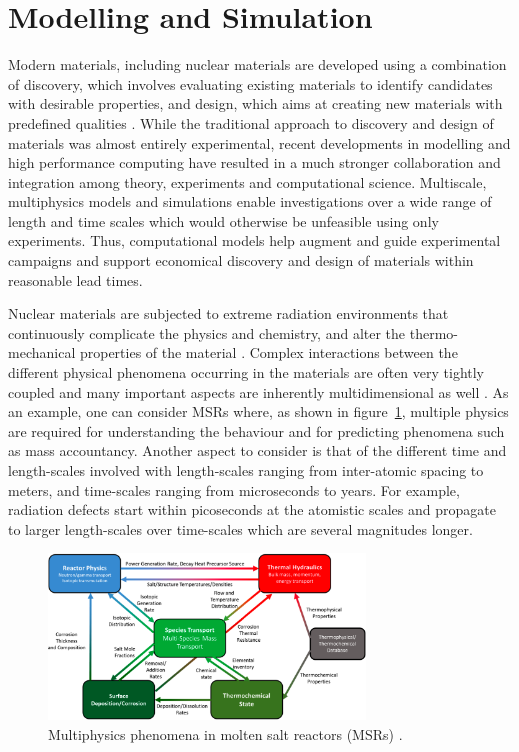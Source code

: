 \section{Modelling and Simulation}
	Modern materials, including nuclear materials are developed using a combination of discovery, which involves evaluating existing materials to identify candidates with desirable properties, and design, which aims at  creating new materials with predefined qualities \cite{STAN200920}. While the traditional approach to discovery and design of materials was almost entirely experimental, recent developments in modelling and high performance computing have resulted in a much stronger collaboration and integration among theory, experiments and computational science. Multiscale, multiphysics models and simulations enable investigations over  a wide range of length and time scales which would otherwise be unfeasible using only experiments. Thus, computational models help augment and guide experimental campaigns and support economical discovery and design of materials within reasonable lead times.

	 Nuclear materials are subjected to extreme radiation environments that continuously complicate the physics and chemistry, and alter the thermo-mechanical properties of the material \cite{STAN200920}. Complex interactions between the different physical phenomena occurring in the materials are often very tightly coupled and many important aspects are inherently multidimensional  as well \cite{WILLIAMSON2012149}. As an example, one can consider MSRs where, as shown in figure~\ref{fig:msr_mf}, multiple physics  are required for understanding the behaviour and for predicting phenomena such as mass accountancy. Another aspect to consider is that of the different time and length-scales involved with length-scales ranging from inter-atomic spacing to meters, and time-scales ranging from microseconds to years. For example, radiation defects start within picoseconds at the atomistic scales and propagate to larger length-scales over time-scales which are several magnitudes longer.
	\begin{figure}[htb]
		\centering
		\includegraphics[width=0.75\textwidth]{figures/chapter-1/MSR_MP}
		\caption[Multiphysics phenomena in molten salt reactors (MSRs).]{Multiphysics phenomena in molten salt reactors (MSRs) \cite{McMurray:2021aa}.}
		\label{fig:msr_mf}
	\end{figure}
	
